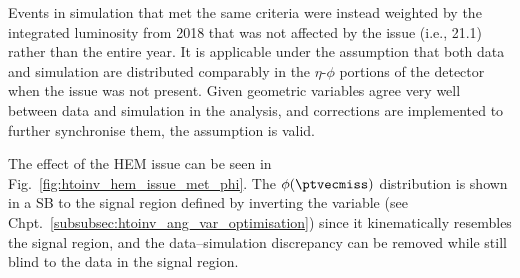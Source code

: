 \medskip

\noindent{}Events in simulation that met the same criteria were instead weighted by the integrated luminosity from 2018 that was not affected by the issue (i.e., 21.1\fbinv) rather than the entire year. It is applicable under the assumption that both data and simulation are distributed comparably in the $\eta$-$\phi$ portions of the detector when the issue was not present. Given geometric variables agree very well between data and simulation in the analysis, and corrections are implemented to further synchronise them, the assumption is valid.

The effect of the HEM issue can be seen in Fig.~\ref{fig:htoinv_hem_issue_met_phi}. The $\phi(\ptvecmiss)$ distribution is shown in a \gls{SB} to the signal region defined by inverting the \omegaTilde variable (see Chpt.~\ref{subsubsec:htoinv_ang_var_optimisation}) since it kinematically resembles the signal region, and the data--simulation discrepancy can be removed while still blind to the data in the signal region.

